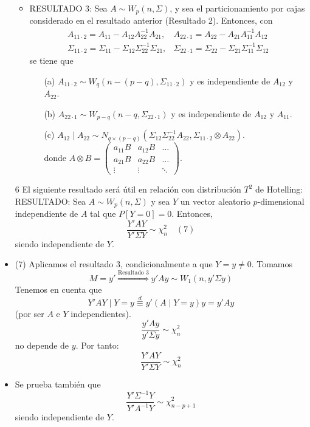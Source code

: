 \documentclass[11pt,a4paper]{article}
\begin{document}
\begin{itemize}
\begin{itemize}
\item RESULTADO 3: Sea $A \sim W_{p}(n, \Sigma)$, y sea el particionamiento por cajas considerado en el resultado anterior (Resultado 2). Entonces, con
$$\begin{matrix}
A_{11 \cdot 2} = A_{11} - A_{12}A_{22}^{-1}A_{21}, & A_{22 \cdot 1} = A_{22} - A_{21}A_{11}^{-1}A_{12} \\
\Sigma_{11 \cdot 2} = \Sigma_{11} - \Sigma_{12}\Sigma_{22}^{-1}\Sigma_{21}, & \Sigma_{22 \cdot 1} = \Sigma_{22} - \Sigma_{21}\Sigma_{11}^{-1}\Sigma_{12}
\end{matrix}$$
se tiene que
\begin{itemize}
\item[(a)] $A_{11 \cdot 2} \sim W_{q}(n-(p-q), \Sigma_{11 \cdot 2})$ y es independiente de $A_{12}$ y $A_{22}$.
\item[(b)] $A_{22 \cdot 1} \sim W_{p-q}(n-q, \Sigma_{22 \cdot 1})$ y es independiente de $A_{12}$ y $A_{11}$.
\item[(c)] $A_{12} \mid A_{22} \sim N_{q \times (p-q)}(\Sigma_{12}\Sigma_{22}^{-1}A_{22}, \Sigma_{11 \cdot 2} \otimes A_{22})$. \\
donde $A \otimes B = \begin{pmatrix}
a_{11}B & a_{12}B & \dots \\
a_{21}B & a_{22}B & \dots \\
\vdots & \vdots & \ddots
\end{pmatrix}$.
\end{itemize}
\end{itemize}

\item[6] El siguiente resultado será útil en relación con distribución $T^{2}$ de Hotelling: \\
RESULTADO: Sea $A \sim W_{p}(n, \Sigma)$ y sea $Y$ un vector aleatorio $p$-dimensional independiente de $A$ tal que $P[Y=0]=0$. Entonces,
$$\frac{Y'AY}{Y'\Sigma Y} \sim \chi_{n}^{2} \quad (7)$$
siendo independiente de $Y$.

\item (7) Aplicamos el resultado 3, condicionalmente a que $Y = y \neq 0$. Tomamos
$$M = y' \overset{\text{Resultado } 3}{\Longrightarrow} y'Ay \sim W_{1}(n, y' \Sigma y)$$
Tenemos en cuenta que
$$Y'AY \mid Y = y \overset{d}{\equiv} y'(A \mid Y=y)y = y'Ay$$
(por ser $A$ e $Y$ independientes).
$$\frac{y'Ay}{y' \Sigma y} \sim \chi_{n}^{2}$$
no depende de $y$. Por tanto:
$$\frac{Y'AY}{Y' \Sigma Y} \sim \chi_{n}^{2}$$

\item Se prueba también que
$$\frac{Y'\Sigma^{-1}Y}{Y'A^{-1}Y} \sim \chi_{n-p+1}^{2}$$
siendo independiente de $Y$.


\end{itemize}
\end{document}
